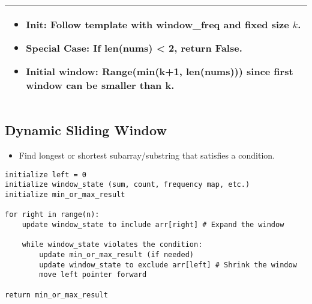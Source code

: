 \begin{summary}
\begin{center}
\begin{tabular}{ll}
            \multicolumn{2}{p{\linewidth}}{
                \begin{itemize}
                    \item \textbf{Init:} Follow template with window\_freq and fixed size $k$.
                    \item \textbf{Special Case:} If len(nums) < 2, return False.
                    \item \textbf{Initial window:} Range(min(k+1, len(nums))) since first window can be smaller than k.
                \end{itemize}
            } \\
            \bottomrule
        \end{tabular}
    \end{center}
\end{summary}
\newpage

\subsection{Dynamic Sliding Window}
\begin{summary}
    \begin{itemize}
        \item Find longest or shortest subarray/substring that satisfies a condition.
    \end{itemize}
\end{summary}

\begin{algo}
\begin{lstlisting}
initialize left = 0
initialize window_state (sum, count, frequency map, etc.)
initialize min_or_max_result

for right in range(n):
    update window_state to include arr[right] # Expand the window

    while window_state violates the condition:
        update min_or_max_result (if needed)
        update window_state to exclude arr[left] # Shrink the window
        move left pointer forward

return min_or_max_result
\end{lstlisting}
\end{algo}
\newpage

